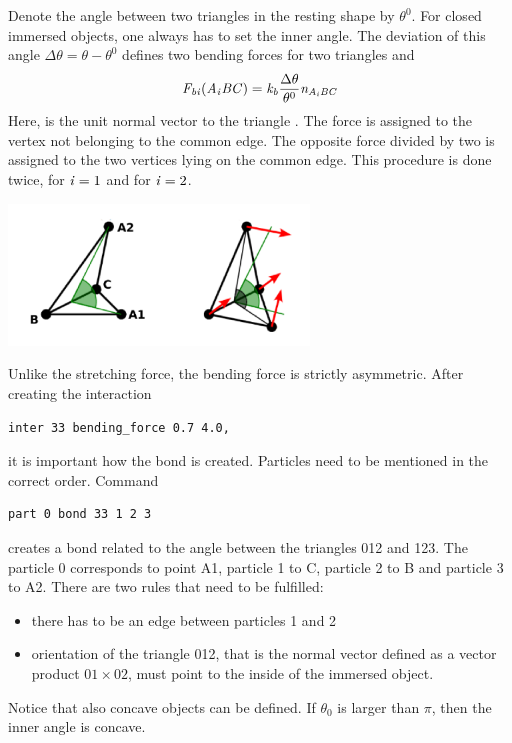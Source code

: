 Denote the angle between two triangles in the resting shape by $\theta^0$. For 
closed immersed objects, one always has to set the inner angle. The deviation 
of this angle $\Delta \theta = \theta - \theta^0$ defines two 
bending forces for two triangles  and 
\begin{equation}
\var{F_{bi}(A_iBC)} = \var{k_b}\frac{\Delta \theta}{\theta^0} \var{n_{A_iBC}}
\end{equation}
Here,  is the unit normal vector to the triangle . The 
force  is assigned to the vertex not belonging to the common 
edge. The opposite force divided by two is assigned to the two vertices lying on 
the common edge. This procedure is done twice, for $\var{i}=1$ and for 
$\var{i}=2$.

\begin{center}
  \includegraphics[width=8cm]{figures/bending.png}
\end{center}

Unlike the stretching force, the bending force is strictly asymmetric. After 
creating the interaction
\begin{verbatim} 
inter 33 bending_force 0.7 4.0,
\end{verbatim}
it is important how the bond is created. Particles need to be mentioned in the 
correct order. Command
\begin{verbatim} 
part 0 bond 33 1 2 3
\end{verbatim}
creates a bond related to the angle between the triangles 012 and 123. The particle 
0 corresponds to point A1, particle 1 to C, particle 2 to B and particle 3 to A2. 
There are two rules that need to be fulfilled:
\begin{itemize}
\item there has to be an edge between particles 1 and 2
\item orientation of the triangle 012, that is the normal vector 
defined as a vector product $01 \times 02$, must point to the inside of the immersed 
object.
\end{itemize}
Notice that also concave objects can be defined. If $\theta_0$ is larger than $\pi$, 
then the inner angle is concave.

